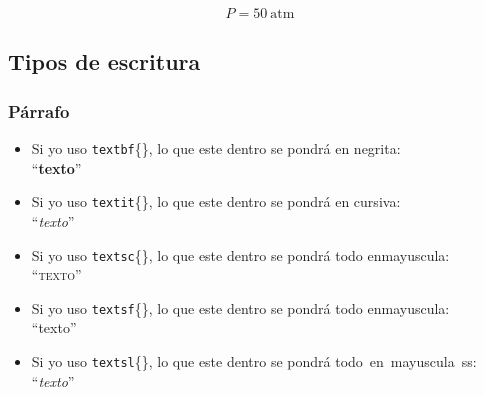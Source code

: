\begin{equation}
\label{Atmos}
P=50~\text{atm}
\end{equation}

\subsection{Tipos de escritura}
\subsubsection*{Párrafo}

\begin{itemize}
\item Si yo uso \texttt{textbf}\{\}, lo que este dentro se pondrá en negrita:\\``\textbf{texto}''

\item Si yo uso \texttt{textit}\{\}, lo que este dentro se pondrá en cursiva:\\``\textit{texto}''

\item Si yo uso \texttt{textsc}\{\}, lo que este dentro se pondrá todo en\linebreak mayuscula:\\``\textsc{texto}''

\item Si yo uso \texttt{textsf}\{\}, lo que este dentro se pondrá todo en\linebreak mayuscula:\\``\textsf{texto}''

\item Si yo uso \texttt{textsl}\{\}, lo que este dentro se pondrá todo~en~mayuscula~ss:\\``\textsl{texto}''

\end{itemize}

